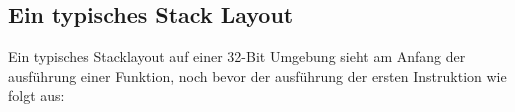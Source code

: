 \subsection{Ein typisches Stack Layout}

Ein typisches Stacklayout auf einer 32-Bit Umgebung sieht am Anfang 
der ausführung einer Funktion, noch bevor der ausführung der ersten 
Instruktion wie folgt aus:




